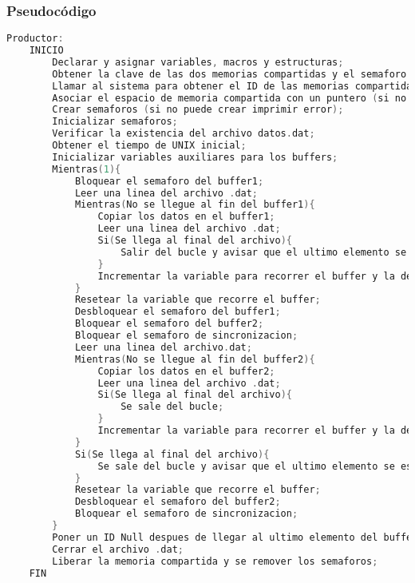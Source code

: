 \subsubsection{Pseudocódigo}

\begin{lstlisting}[language=C]          % No usar tildes en el pseudocódigo
    Productor:
    INICIO
        Declarar y asignar variables, macros y estructuras;
        Obtener la clave de las dos memorias compartidas y el semaforo (en el caso de no obtenerlas imprimir error);
        Llamar al sistema para obtener el ID de las memorias compartidas (en el caso de que no obtenerlas imprimir error);
        Asociar el espacio de memoria compartida con un puntero (si no puede asociar imprimir error);
        Crear semaforos (si no puede crear imprimir error);
        Inicializar semaforos;
        Verificar la existencia del archivo datos.dat;
        Obtener el tiempo de UNIX inicial;
        Inicializar variables auxiliares para los buffers;
        Mientras(1){
	        Bloquear el semaforo del buffer1;
	        Leer una linea del archivo .dat;
	        Mientras(No se llegue al fin del buffer1){
		        Copiar los datos en el buffer1;
		        Leer una linea del archivo .dat;
		        Si(Se llega al final del archivo){
			        Salir del bucle y avisar que el ultimo elemento se escribio en el buffer1;
                }
                Incrementar la variable para recorrer el buffer y la del id;
	        }
            Resetear la variable que recorre el buffer;
            Desbloquear el semaforo del buffer1;
            Bloquear el semaforo del buffer2;
            Bloquear el semaforo de sincronizacion;
            Leer una linea del archivo.dat;
            Mientras(No se llegue al fin del buffer2){
		        Copiar los datos en el buffer2;
		        Leer una linea del archivo .dat;
		        Si(Se llega al final del archivo){
			        Se sale del bucle;
                }
                Incrementar la variable para recorrer el buffer y la del ID;
            }
            Si(Se llega al final del archivo){
        	    Se sale del bucle y avisar que el ultimo elemento se escribio en el buffer2;
            }
            Resetear la variable que recorre el buffer;
            Desbloquear el semaforo del buffer2;
            Bloquear el semaforo de sincronizacion;
        }
        Poner un ID Null despues de llegar al ultimo elemento del buffer correspondiente para avisarle al consumidor que se llego al EOF;
        Cerrar el archivo .dat;
        Liberar la memoria compartida y se remover los semaforos;
    FIN


\end{lstlisting}
